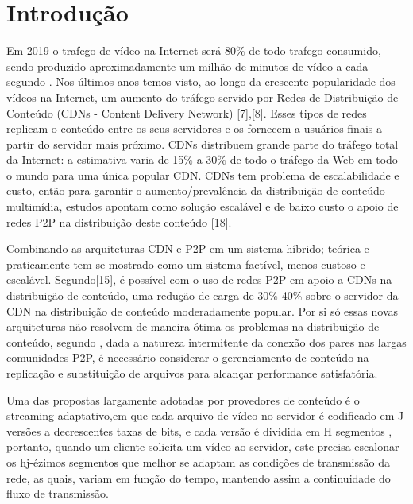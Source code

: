 \documentclass[
	12pt,				%
	oneside,			%
	a4paper,			%
	english,			%
	brazil				%
	]{abntex2ppgsi}
\begin{document}
\frenchspacing 


\imprimircapa

\setlength{\absparsep}{18pt} %
\begin{resumo}
\end{resumo}



\chapter{Introdução}

Em 2019 o trafego de vídeo na Internet será 80\% de todo trafego consumido, sendo produzido aproximadamente um milhão de minutos de vídeo a cada segundo \cite{CISCO2015}. Nos últimos anos temos visto, ao longo da crescente popularidade dos vídeos na Internet, um aumento do tráfego servido por Redes de Distribuição de Conteúdo (CDNs - Content Delivery Network) [7],[8]. 
Esses tipos de redes replicam o conteúdo entre os seus servidores e os fornecem a usuários finais a partir do servidor mais próximo. CDNs distribuem grande parte do tráfego total da Internet: a estimativa varia de 15\% a 30\% de todo o tráfego da Web em todo o mundo para uma única popular CDN. 
CDNs tem problema de escalabilidade e custo, então para garantir o aumento/prevalência da distribuição de conteúdo multimídia, estudos apontam como solução escalável e de baixo custo o apoio de redes P2P na distribuição deste conteúdo [18].

Combinando as arquiteturas CDN e P2P em um sistema híbrido; teórica e praticamente tem se mostrado como um sistema factível, menos custoso e escalável. Segundo[15], é possível com o uso de redes P2P em apoio a CDNs na distribuição de conteúdo, uma redução de carga de 30\%-40\% sobre o servidor da CDN na distribuição de conteúdo moderadamente popular.
Por si só essas novas arquiteturas não resolvem de maneira ótima os problemas na distribuição de conteúdo, segundo \cite{Kangasharju2007}, dada a natureza intermitente da conexão dos pares nas largas comunidades P2P, é necessário considerar o gerenciamento de conteúdo na replicação e substituição de arquivos para alcançar performance satisfatória.

Uma das propostas largamente adotadas por provedores de conteúdo é o streaming adaptativo,em que cada arquivo de vídeo no servidor é codificado em J versões a decrescentes taxas de bits, e cada versão é dividida em H segmentos \cite{Tian2013}, portanto, quando um cliente solicita um vídeo ao servidor, este precisa escalonar os hj-ézimos segmentos que melhor se adaptam as condições de transmissão da rede, as quais, variam em função do tempo, mantendo assim a continuidade do fluxo de transmissão.
\end{document}
